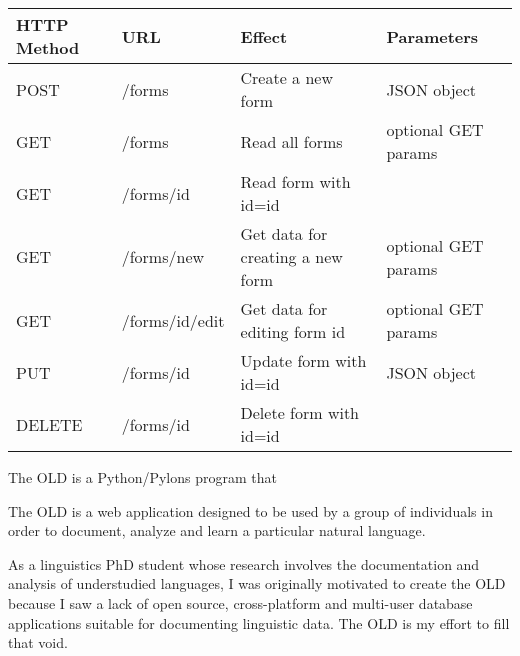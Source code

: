 \documentclass[letterpaper,10pt,english]{sphinxmanual}
\begin{document}
\begin{tabulary}{\linewidth}{|L|L|L|L|}
\hline
\textbf{
HTTP Method
} & \textbf{
URL
} & \textbf{
Effect
} & \textbf{
Parameters
}\\\hline

POST
 & 
/forms
 & 
Create a new form
 & 
JSON object
\\\hline

GET
 & 
/forms
 & 
Read all forms
 & 
optional GET params
\\\hline

GET
 & 
/forms/id
 & 
Read form with id=id
 & \\\hline

GET
 & 
/forms/new
 & 
Get data for creating a new form
 & 
optional GET params
\\\hline

GET
 & 
/forms/id/edit
 & 
Get data for editing form id
 & 
optional GET params
\\\hline

PUT
 & 
/forms/id
 & 
Update form with id=id
 & 
JSON object
\\\hline

DELETE
 & 
/forms/id
 & 
Delete form with id=id
 & \\\hline
\end{tabulary}


The OLD is a Python/Pylons program that

The OLD is a web application designed to be used by a group of individuals in
order to document, analyze and learn a particular natural language.

As a linguistics PhD student whose research involves the documentation and
analysis of understudied languages, I was originally motivated to create the
OLD because I saw a lack of open source, cross-platform and multi-user database
applications suitable for documenting linguistic data.  The OLD is my effort to
fill that void.
\end{document}
